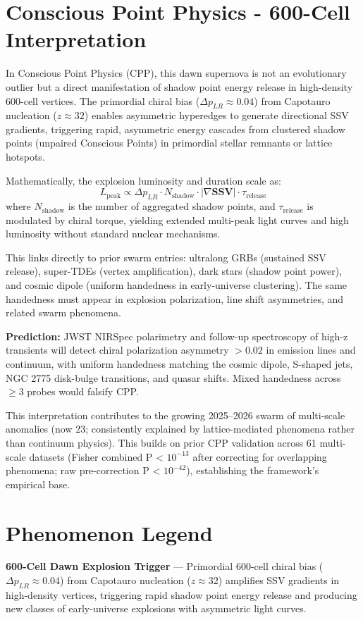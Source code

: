 \documentclass[11pt]{article}
\begin{document}
\section{Conscious Point Physics - 600-Cell Interpretation}
In Conscious Point Physics (CPP), this dawn supernova is not an evolutionary outlier but a direct manifestation of shadow point energy release in high-density 600-cell vertices. The primordial chiral bias ($\Delta p_{LR} \approx 0.04$) from Capotauro nucleation ($z \approx 32$) enables asymmetric hyperedges to generate directional SSV gradients, triggering rapid, asymmetric energy cascades from clustered shadow points (unpaired Conscious Points) in primordial stellar remnants or lattice hotspots.

Mathematically, the explosion luminosity and duration scale as:
\[
L_{\text{peak}} \propto \Delta p_{LR} \cdot N_{\text{shadow}} \cdot |\nabla \mathbf{SSV}| \cdot \tau_{\text{release}}
\]
where $N_{\text{shadow}}$ is the number of aggregated shadow points, and $\tau_{\text{release}}$ is modulated by chiral torque, yielding extended multi-peak light curves and high luminosity without standard nuclear mechanisms.

This links directly to prior swarm entries: ultralong GRBs (sustained SSV release), super-TDEs (vertex amplification), dark stars (shadow point power), and cosmic dipole (uniform handedness in early-universe clustering). The same handedness must appear in explosion polarization, line shift asymmetries, and related swarm phenomena.

\textbf{Prediction:} JWST NIRSpec polarimetry and follow-up spectroscopy of high-z transients will detect chiral polarization asymmetry $>0.02$ in emission lines and continuum, with uniform handedness matching the cosmic dipole, S-shaped jets, NGC 2775 disk-bulge transitions, and quasar shifts. Mixed handedness across $\geq 3$ probes would falsify CPP.

This interpretation contributes to the growing 2025--2026 swarm of multi-scale anomalies (now 23; consistently explained by lattice-mediated phenomena rather than continuum physics). This builds on prior CPP validation across 61 multi-scale datasets (Fisher combined P < $10^{-13}$ after correcting for overlapping phenomena; raw pre-correction P < $10^{-42}$), establishing the framework's empirical base.

\section{Phenomenon Legend}
\textbf{600-Cell Dawn Explosion Trigger} — Primordial 600-cell chiral bias ($\Delta p_{LR} \approx 0.04$) from Capotauro nucleation ($z \approx 32$) amplifies SSV gradients in high-density vertices, triggering rapid shadow point energy release and producing new classes of early-universe explosions with asymmetric light curves.
\end{document}
